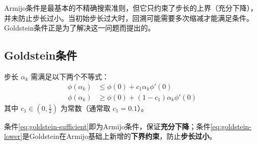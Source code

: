 Armijo条件是最基本的不精确搜索准则，但它只约束了步长的上界（充分下降），并未防止步长过小。当初始步长过大时，回溯可能需要多次缩减才能满足条件。Goldstein条件正是为了解决这一问题而提出的。

\subsection{Goldstein条件}\label{sec:goldstein}

\begin{conceptbox}[Goldstein条件]
步长 $\alpha_k$ 需满足以下两个不等式：
\begin{align}
\phi(\alpha_k) &\leq \phi(0) + c_1 \alpha_k \phi'(0) \label{eq:goldstein-sufficient} \\
\phi(\alpha_k) &\geq \phi(0) + (1-c_1) \alpha_k \phi'(0) \label{eq:goldstein-lower}
\end{align}
其中 $c_1 \in (0, \frac{1}{2})$ 为常数（通常取 $c_1 = 0.1$）。
\end{conceptbox}

条件\eqref{eq:goldstein-sufficient}即为Armijo条件，保证\textbf{充分下降}；条件\eqref{eq:goldstein-lower}是Goldstein在Armijo基础上新增的\textbf{下界约束}，防止\textbf{步长过小}。

